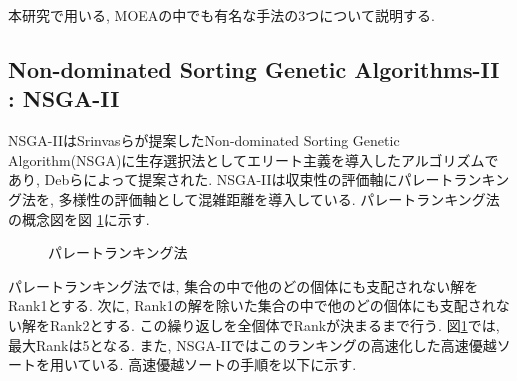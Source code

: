 \documentclass[12pt,a4j,notitlepage]{jreport}
\begin{document}
本研究で用いる, MOEAの中でも有名な手法の3つについて説明する.
\subsection{Non-dominated Sorting Genetic Algorithms-II : NSGA-II}
NSGA-II\cite{Deb}はSrinvasらが提案したNon-dominated Sorting Genetic Algorithm(NSGA)に生存選択法としてエリート主義を導入したアルゴリズムであり, Debらによって提案された.
NSGA-IIは収束性の評価軸にパレートランキング法を, 多様性の評価軸として混雑距離を導入している.
パレートランキング法の概念図を図 \ref{fig:ranking}に示す.
\begin{figure}[htbp]
	\begin{center}

             		\setlength{\abovecaptionskip}{0mm}
		\setlength{\belowcaptionskip}{0mm}
			\caption{パレートランキング法}
	\label{fig:ranking}
	\end{center}
\end{figure}
\vspace{3mm}
パレートランキング法では, 集合の中で他のどの個体にも支配されない解をRank1とする.
次に, Rank1の解を除いた集合の中で他のどの個体にも支配されない解をRank2とする.
この繰り返しを全個体でRankが決まるまで行う.
図\ref{fig:ranking}では, 最大Rankは5となる.
また, NSGA-IIではこのランキングの高速化した高速優越ソートを用いている.
高速優越ソートの手順を以下に示す.
\end{document}
